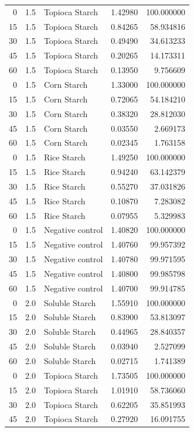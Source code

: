 \documentclass[
  12pt,
]{article}
\begin{document}
{\begin{longtable}[]{@{}rrlrr@{}}
0 & 1.5 & Topioca Starch & 1.42980 & 100.000000 \\
15 & 1.5 & Topioca Starch & 0.84265 & 58.934816 \\
30 & 1.5 & Topioca Starch & 0.49490 & 34.613233 \\
45 & 1.5 & Topioca Starch & 0.20265 & 14.173311 \\
60 & 1.5 & Topioca Starch & 0.13950 & 9.756609 \\
0 & 1.5 & Corn Starch & 1.33000 & 100.000000 \\
15 & 1.5 & Corn Starch & 0.72065 & 54.184210 \\
30 & 1.5 & Corn Starch & 0.38320 & 28.812030 \\
45 & 1.5 & Corn Starch & 0.03550 & 2.669173 \\
60 & 1.5 & Corn Starch & 0.02345 & 1.763158 \\
0 & 1.5 & Rice Starch & 1.49250 & 100.000000 \\
15 & 1.5 & Rice Starch & 0.94240 & 63.142379 \\
30 & 1.5 & Rice Starch & 0.55270 & 37.031826 \\
45 & 1.5 & Rice Starch & 0.10870 & 7.283082 \\
60 & 1.5 & Rice Starch & 0.07955 & 5.329983 \\
0 & 1.5 & Negative control & 1.40820 & 100.000000 \\
15 & 1.5 & Negative control & 1.40760 & 99.957392 \\
30 & 1.5 & Negative control & 1.40780 & 99.971595 \\
45 & 1.5 & Negative control & 1.40800 & 99.985798 \\
60 & 1.5 & Negative control & 1.40700 & 99.914785 \\
0 & 2.0 & Soluble Starch & 1.55910 & 100.000000 \\
15 & 2.0 & Soluble Starch & 0.83900 & 53.813097 \\
30 & 2.0 & Soluble Starch & 0.44965 & 28.840357 \\
45 & 2.0 & Soluble Starch & 0.03940 & 2.527099 \\
60 & 2.0 & Soluble Starch & 0.02715 & 1.741389 \\
0 & 2.0 & Topioca Starch & 1.73505 & 100.000000 \\
15 & 2.0 & Topioca Starch & 1.01910 & 58.736060 \\
30 & 2.0 & Topioca Starch & 0.62205 & 35.851993 \\
45 & 2.0 & Topioca Starch & 0.27920 & 16.091755 \\

\end{longtable}}
\end{document}
